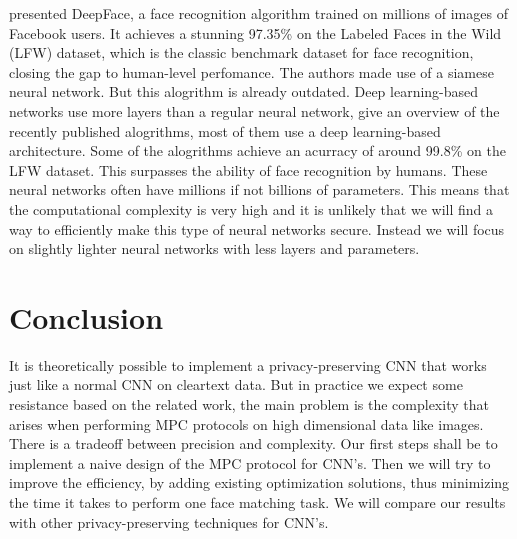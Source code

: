 \cite{taigman2014deepface} presented DeepFace, a face recognition algorithm trained on millions of images of Facebook users. It achieves a stunning 97.35\% on the Labeled Faces in the Wild (LFW) dataset, which is the classic benchmark dataset for face recognition, closing the gap to human-level perfomance. The authors made use of a siamese neural network. But this alogrithm is already outdated. Deep learning-based networks use more layers than a regular neural network, \cite{wang2018deep} give an overview of the recently published alogrithms, most of them use a deep learning-based architecture. Some of the alogrithms achieve an acurracy of around 99.8\% on the LFW dataset. This surpasses the ability of face recognition by humans. These neural networks often have millions if not billions of parameters. This means that the computational complexity is very high and it is unlikely that we will find a way to efficiently make this type of neural networks secure. Instead we will focus on slightly lighter neural networks with less layers and parameters.

\section{Conclusion}
It is theoretically possible to implement a privacy-preserving CNN that works just like a normal CNN on cleartext data. But in practice we expect some resistance based on the related work, the main problem is the complexity that arises when performing MPC protocols on high dimensional data like images. There is a tradeoff between precision and complexity. Our first steps shall be to implement a naive design of the MPC protocol for CNN's. Then we will try to improve the efficiency, by adding existing optimization solutions, thus minimizing the time it takes to perform one face matching task. We will compare our results with other privacy-preserving techniques for CNN's.
